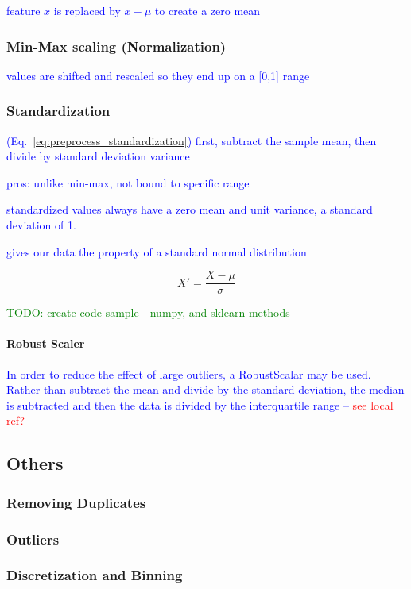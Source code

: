 \textcolor{blue}{feature $x$ is replaced by $x - \mu$ to create a zero mean}


\subsubsection{Min-Max scaling (Normalization)}

\textcolor{blue}{values are shifted and rescaled so they end up on a [0,1] range}

\subsubsection{Standardization}

\textcolor{blue}{(Eq.~\ref{eq:preprocess_standardization}) first, subtract the sample mean, then divide by standard deviation variance}

\textcolor{blue}{pros: unlike min-max, not bound to specific range}

\textcolor{blue}{standardized values always have a zero mean and unit variance, a standard deviation of 1.}

\textcolor{blue}{gives our data the property of a standard normal distribution}

\begin{equation}
{X' = \frac{X - \mu}{\sigma}}
\label{eq:preprocess_standardization}
\end{equation}

\textcolor{green}{TODO: create code sample - numpy, and sklearn methods}

\paragraph{Robust Scaler}

\textcolor{blue}{In order to reduce the effect of large outliers, a \textcolor{blue}{RobustScalar} may be used. Rather than subtract the mean and divide by the standard deviation, the median is subtracted and then the data is divided by the {interquartile range} -- \textcolor{red}{see local ref?}}


\subsection{Others}

\subsubsection{Removing Duplicates}

\subsubsection{Outliers}

\subsubsection{Discretization and Binning}

